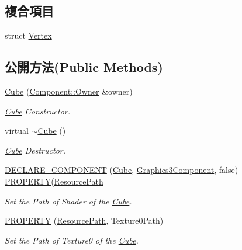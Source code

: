 \subsection*{複合項目}
\begin{DoxyCompactItemize}
\item 
struct \hyperlink{struct_magnum_1_1_cube_1_1_vertex}{Vertex}
\end{DoxyCompactItemize}
\subsection*{公開方法(Public Methods)}
\begin{DoxyCompactItemize}
\item 
\hyperlink{class_magnum_1_1_cube_a22ed9e5edafea9f5c96af56ce6dff146}{Cube} (\hyperlink{class_magnum_1_1_component_1_1_owner}{Component\+::\+Owner} \&owner)
\begin{DoxyCompactList}\small\item\em \hyperlink{class_magnum_1_1_cube}{Cube} Constructor. \end{DoxyCompactList}\item 
virtual \hyperlink{class_magnum_1_1_cube_aa814e979cecb8c451fdb332ded2cea1e}{$\sim$\+Cube} ()
\begin{DoxyCompactList}\small\item\em \hyperlink{class_magnum_1_1_cube}{Cube} Destructor. \end{DoxyCompactList}\item 
\hyperlink{class_magnum_1_1_cube_a62fa8204229b65c9ad679104324a8577}{D\+E\+C\+L\+A\+R\+E\+\_\+\+C\+O\+M\+P\+O\+N\+E\+NT} (\hyperlink{class_magnum_1_1_cube}{Cube}, \hyperlink{class_magnum_1_1_graphics3_component}{Graphics3\+Component}, false)       \hyperlink{class_magnum_1_1_cube_a513b40dd87f33ef3057107c42ed65d55}{P\+R\+O\+P\+E\+R\+TY}(\hyperlink{class_magnum_1_1_resource_path}{Resource\+Path}
\begin{DoxyCompactList}\small\item\em Set the Path of Shader of the \hyperlink{class_magnum_1_1_cube}{Cube}. \end{DoxyCompactList}\item 
\hyperlink{class_magnum_1_1_cube_a513b40dd87f33ef3057107c42ed65d55}{P\+R\+O\+P\+E\+R\+TY} (\hyperlink{class_magnum_1_1_resource_path}{Resource\+Path}, Texture0\+Path)
\begin{DoxyCompactList}\small\item\em Set the Path of Texture0 of the \hyperlink{class_magnum_1_1_cube}{Cube}. \end{DoxyCompactList}\item 

\end{DoxyCompactItemize}
